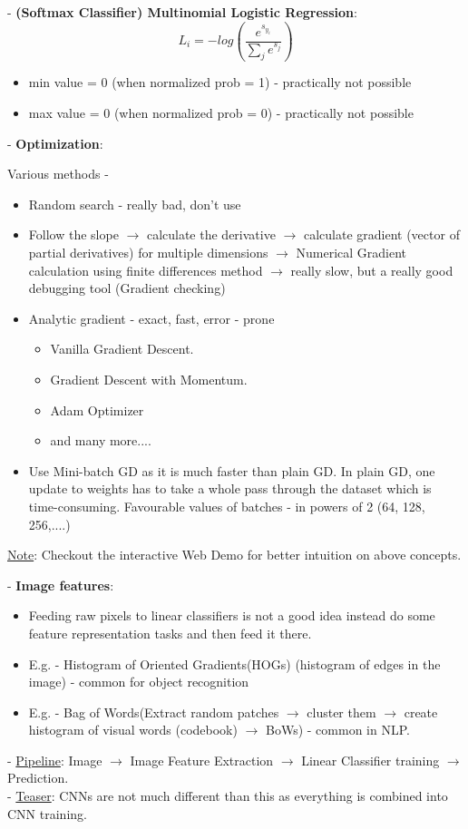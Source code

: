 \documentclass[twoside]{article}
\begin{document}
- \textbf {(Softmax Classifier) Multinomial Logistic Regression}:
\[
\displaystyle L_i = -log(\dfrac{e^{s_{y_i}}}{\sum_j e^{s_j}})
\]
\begin{itemize}
    \item min value = 0 (when normalized prob = 1) - practically not possible
    \item max value = 0 (when normalized prob = 0) - practically not possible
\end{itemize}

- \textbf{Optimization}:

Various methods - 

\begin{itemize}
    \item Random search - really bad, don't use
    \item Follow the slope $\rightarrow$ calculate the derivative $\rightarrow$ calculate gradient (vector of partial derivatives) for multiple dimensions $\rightarrow$ Numerical Gradient calculation using finite differences method $\rightarrow$ really slow, but a really good debugging tool (Gradient checking)
    \item Analytic gradient - exact, fast, error - prone
    \begin{itemize}
        \item Vanilla Gradient Descent.
        \item Gradient Descent with Momentum.
        \item Adam Optimizer
        \item and many more....
    \end{itemize}
    \item Use Mini-batch GD as it is much faster than plain GD. In plain GD, one update to weights has to take a whole pass through the dataset which is time-consuming. Favourable values of batches - in powers of 2 (64, 128, 256,....)
\end{itemize}

\underline{Note}: Checkout the interactive Web Demo for better intuition on above concepts.

- \textbf{Image features}:
\begin{itemize}
    \item Feeding raw pixels to linear classifiers is not a good idea instead do some feature representation tasks and then feed it there.
    \item E.g. - Histogram of Oriented Gradients(HOGs) (histogram of edges in the image) - common for object recognition
    \item E.g. - Bag of Words(Extract random patches $\rightarrow$ cluster them $\rightarrow$ create histogram of visual words (codebook) $\rightarrow$ BoWs) - common in NLP.
\end{itemize}

- \underline{Pipeline}: Image $\rightarrow$ Image Feature Extraction $\rightarrow$ Linear Classifier training $\rightarrow$ Prediction. 
\\

- \underline{Teaser}: CNNs are not much different than this as everything is combined into CNN training.

\end{document}
